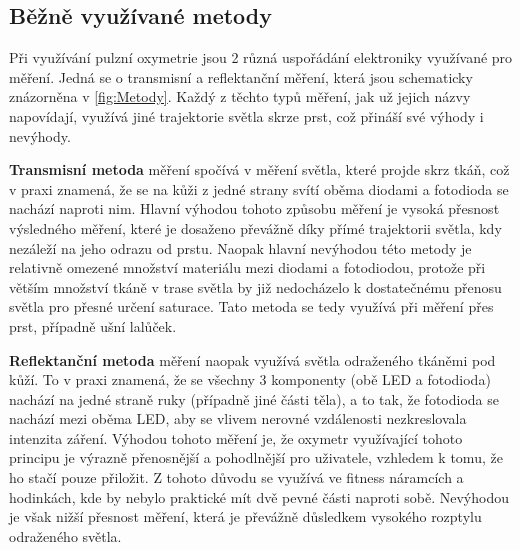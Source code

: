 \subsection {Běžně využívané metody}
Při využívání pulzní oxymetrie jsou 2 různá uspořádání elektroniky využívané pro měření. Jedná se o transmisní a reflektanční měření, která jsou schematicky znázorněna v \ref{fig:Metody}. Každý z těchto typů měření, jak už jejich názvy napovídají, využívá jiné trajektorie světla skrze prst, což přináší své výhody i nevýhody.
\par \textbf{Transmisní metoda} měření spočívá v měření světla, které projde skrz tkáň, což v praxi znamená, že se na kůži z jedné strany svítí oběma diodami a fotodioda se nachází naproti nim. Hlavní výhodou tohoto způsobu měření je vysoká přesnost výsledného měření, které je dosaženo převážně díky přímé trajektorii světla, kdy nezáleží na jeho odrazu od prstu. Naopak hlavní nevýhodou této metody je relativně omezené množství materiálu mezi diodami a fotodiodou, protože při větším množství tkáně v trase světla by již nedocházelo k dostatečnému přenosu světla pro přesné určení saturace. Tato metoda se tedy využívá při měření přes prst, případně ušní lalůček. %
\par \textbf{Reflektanční metoda} měření naopak využívá světla odraženého tkáněmi pod kůží. To v praxi znamená, že se všechny 3 komponenty (obě LED a fotodioda) nachází na jedné straně ruky (případně jiné části těla), a to tak, že fotodioda se nachází mezi oběma LED, aby se vlivem nerovné vzdálenosti nezkreslovala intenzita záření. Výhodou tohoto měření je, že oxymetr využívající tohoto principu je výrazně přenosnější a pohodlnější pro uživatele, vzhledem k tomu, že ho stačí pouze přiložit. Z tohoto důvodu se využívá ve fitness náramcích a hodinkách, kde by nebylo praktické mít dvě pevné části naproti sobě. Nevýhodou je však nižší přesnost měření, která je převážně důsledkem vysokého rozptylu odraženého světla.